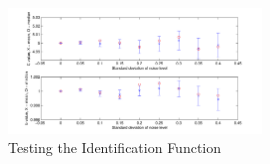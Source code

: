 \begin{figure}
  \centering
  \includegraphics[width=0.6\textwidth]{images/section-3b}
  \caption{Testing the Identification Function\label{3b-fig}}
\end{figure}
